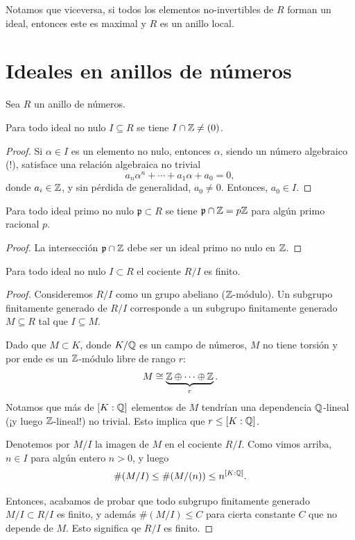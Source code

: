 Notamos que viceversa, si todos los elementos no-invertibles de $R$ forman un
ideal, entonces este es maximal y $R$ es un anillo local.


\section{Ideales en anillos de números}

Sea $R$ un anillo de números.

\begin{lema}
  Para todo ideal no nulo $I \subseteq R$ se tiene $I \cap \mathbb{Z} \ne (0)$.

  \begin{proof}
    Si $\alpha \in I$ es un elemento no nulo, entonces $\alpha$, siendo un
    número algebraico (!), satisface una relación algebraica no trivial
    $$a_n \alpha^n + \cdots + a_1 \alpha + a_0 = 0,$$
    donde $a_i \in \mathbb{Z}$, y sin pérdida de generalidad, $a_0 \ne 0$. Entonces,
    $a_0 \in I$.
  \end{proof}
\end{lema}

\begin{corolario}
  Para todo ideal primo no nulo $\mathfrak{p} \subset R$ se tiene
  $\mathfrak{p} \cap \mathbb{Z} = p\mathbb{Z}$ para algún primo racional $p$.

  \begin{proof}
    La intersección $\mathfrak{p} \cap \mathbb{Z}$ debe ser un ideal primo no nulo en
    $\mathbb{Z}$.
  \end{proof}
\end{corolario}

\begin{teorema}
  \label{thm:R/I-finito}
  Para todo ideal no nulo $I \subset R$ el cociente $R/I$ es finito.

  \begin{proof}
    Consideremos $R/I$ como un grupo abeliano ($\mathbb{Z}$-módulo). Un subgrupo
    finitamente generado de $R/I$ corresponde a un subgrupo finitamente generado
    $M \subseteq R$ tal que $I \subseteq M$.

    Dado que $M \subset K$, donde $K/\mathbb{Q}$ es un campo de números, $M$ no tiene
    torsión y por ende es un $\mathbb{Z}$-módulo libre de rango $r$:
    $$M \cong \underbrace{\mathbb{Z}\oplus\cdots\oplus\mathbb{Z}}_r.$$
    Notamos que más de $[K : \mathbb{Q}]$ elementos de $M$ tendrían una dependencia
    $\mathbb{Q}$-lineal (¡y luego $\mathbb{Z}$-lineal!) no trivial.  Esto implica que
    $r \le [K : \mathbb{Q}]$.

    Denotemos por $M/I$ la imagen de $M$ en el cociente $R/I$.
    Como vimos arriba, $n \in I$ para algún entero $n > 0$, y luego
    $$\# (M/I) \le \# (M/(n)) \le n^{[K : \mathbb{Q}]}.$$

    Entonces, acabamos de probar que todo subgrupo finitamente generado
    $M/I \subset R/I$ es finito, y además $\# (M/I) \le C$ para cierta constante
    $C$ que no depende de $M$. Esto significa qe $R/I$ es finito.
  \end{proof}
\end{teorema}

